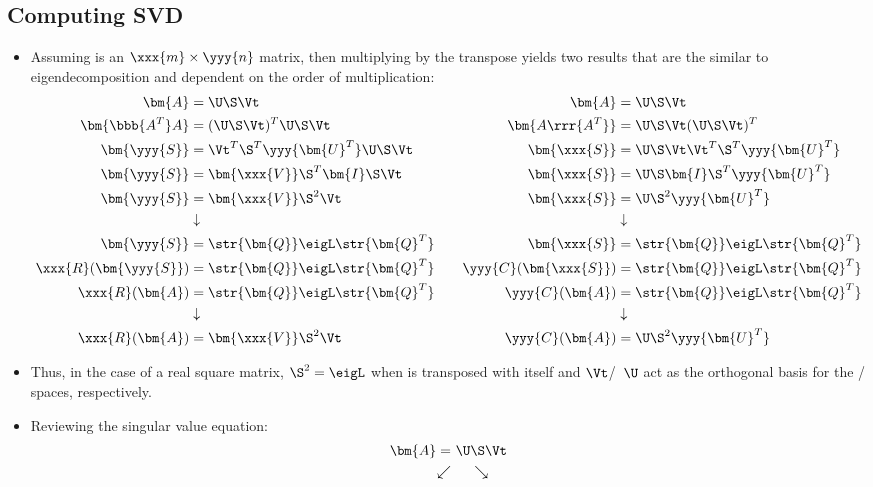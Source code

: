\begin{itemize}
  \newpage
  \subsection{Computing SVD}\label{Computing SVD}
  \begin{itemize}
    \item Assuming  is an \(\xxx{m} \times \yyy{n} \) matrix, then multiplying by the transpose yields two results that are the similar to eigendecomposition and dependent on the order of multiplication:
    \begin{align*}
      \bm{A} &= \U \S \Vt &&& \bm{A} &= \U \S \Vt \\
      \bm{\bbb{A^T}A} &= (\U\S\Vt)^T \U\S\Vt &&& \bm{A\rrr{A^T}} &=  \U\S\Vt (\U\S\Vt)^T \\
      \bm{\yyy{S}} &= \Vt^T\S^T\yyy{\bm{U}^T} \U\S\Vt &&& \bm{\xxx{S}} &=  \U\S\Vt \Vt^T\S^T\yyy{\bm{U}^T} \\
      \bm{\yyy{S}} &= \bm{\xxx{V}}\S^T\bm{I}\S\Vt &&& \bm{\xxx{S}} &=  \U\S\bm{I}\S^T\yyy{\bm{U}^T} \\
      \bm{\yyy{S}} &= \bm{\xxx{V}}\S^2\Vt &&& \bm{\xxx{S}} &=  \U\S^2\yyy{\bm{U}^T} \\
      &\downarrow &&& &\downarrow \\
      \bm{\yyy{S}} &= \str{\bm{Q}}\eigL \str{\bm{Q}^T} &&& \bm{\xxx{S}} &= \str{\bm{Q}}\eigL \str{\bm{Q}^T} \\
      \xxx{R}(\bm{\yyy{S}}) &= \str{\bm{Q}}\eigL \str{\bm{Q}^T} &&& \yyy{C}(\bm{\xxx{S}}) &= \str{\bm{Q}}\eigL \str{\bm{Q}^T} \\
      \xxx{R}(\bm{A}) &= \str{\bm{Q}}\eigL \str{\bm{Q}^T} &&& \yyy{C}(\bm{A}) &= \str{\bm{Q}}\eigL \str{\bm{Q}^T} \\
      &\downarrow &&& &\downarrow \\ 
      \xxx{R}(\bm{A}) &= \bm{\xxx{V}}\S^2\Vt &&& \yyy{C}(\bm{A}) &=  \U\S^2\yyy{\bm{U}^T} 
    \end{align*}
    \item Thus, in the case of a real square matrix, \(\S^2 = \eigL\) when  is transposed with itself and \(\Vt\)/~\(\U\) act as the orthogonal basis for the / spaces, respectively.
    \item Reviewing the singular value equation:
    \begin{align*}
      \bm{A} = &~\U \S \Vt \\ 
      \swarrow &\hspace{14pt} \searrow \\

\end{align*}
\end{itemize}
\end{itemize}
